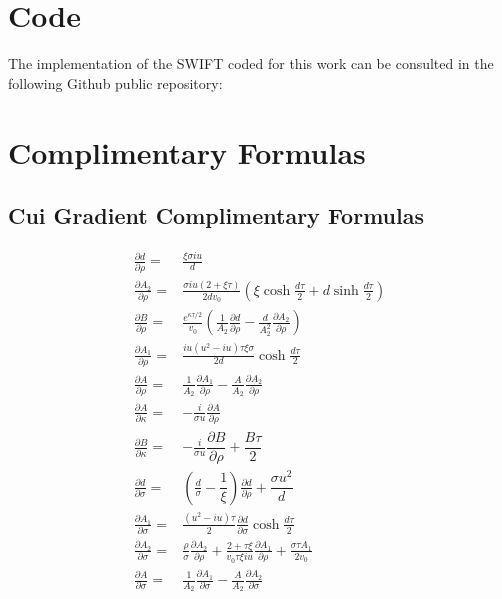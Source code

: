 \documentclass[12,twoside]{mammeTFM}
\theoremstyle{definition}
\theoremstyle{remark}
\begin{document}
\newpage

{}


\appendix
\vfill\newpage 
\section{Code}
The implementation of the SWIFT coded for this work can be consulted in the following Github public repository:


\section{Complimentary Formulas}
\subsection{Cui Gradient Complimentary Formulas} \label{app:cui_extra}

\begin{align}
\frac{\partial d}{\partial \rho}=&\frac{\xi \sigma i u}{d} \\
\frac{\partial A_{2}}{\partial \rho}=&\frac{\sigma i u(2+\xi \tau)}{2 d v_{0}}\left(\xi \cosh \frac{d \tau}{2}+d \sinh \frac{d \tau}{2}\right) \\
\frac{\partial B}{\partial \rho}=&\frac{e^{\kappa \tau / 2}}{v_{0}}\left(\frac{1}{A_{2}} \frac{\partial d}{\partial \rho}-\frac{d}{A_{2}^{2}} \frac{\partial A_{2}}{\partial \rho}\right) \\
\frac{\partial A_{1}}{\partial \rho}=&\frac{i u\left(u^{2}-i u\right) \tau \xi \sigma}{2 d} \cosh \frac{d \tau}{2} \\
\frac{\partial A}{\partial \rho}=&\frac{1}{A_{2}} \frac{\partial A_{1}}{\partial \rho}-\frac{A}{A_{2}} \frac{\partial A_{2}}{\partial \rho}\\
\frac{\partial A}{\partial \kappa}=&-\frac{i}{\sigma u} \frac{\partial A}{\partial \rho}\\
\frac{\partial B}{\partial \kappa}=&-\frac{i}{\sigma u}\dfrac{\partial B}{\partial \rho} + \dfrac{B \tau}{2}\\
\frac{\partial d}{\partial \sigma}=& \left( \frac{d}{\sigma} - \dfrac{1}{\xi} \right) \frac{\partial d}{\partial \rho} + \dfrac{\sigma u^2}{d}\\
\frac{\partial A_{1}}{\partial \sigma}=&\frac{\left(u^{2}-i u\right) \tau}{2} \frac{\partial d}{\partial \sigma} \cosh \frac{d \tau}{2} \\
\frac{\partial A_{2}}{\partial \sigma}=&\frac{\rho}{\sigma} \frac{\partial A_{2}}{\partial \rho}+\frac{2+\tau \xi}{v_{0} \tau \xi i u} \frac{\partial A_{1}}{\partial \rho}+\frac{\sigma \tau A_{1}}{2 v_{0}} \\
\frac{\partial A}{\partial \sigma}=&\frac{1}{A_{2}} \frac{\partial A_{1}}{\partial \sigma}-\frac{A}{A_{2}} \frac{\partial A_{2}}{\partial \sigma}
\end{align}
\end{document}
